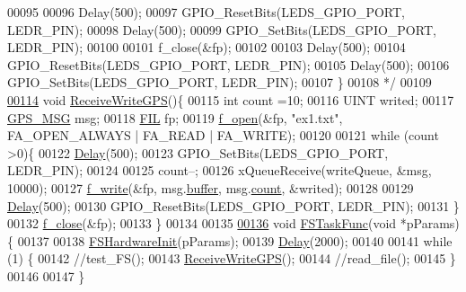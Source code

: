 \begin{DoxyCode}
00095 \textcolor{comment}{}
00096 \textcolor{comment}{  Delay(500);}
00097 \textcolor{comment}{  GPIO\_ResetBits(LEDS\_GPIO\_PORT, LEDR\_PIN);}
00098 \textcolor{comment}{  Delay(500);}
00099 \textcolor{comment}{  GPIO\_SetBits(LEDS\_GPIO\_PORT, LEDR\_PIN);}
00100 \textcolor{comment}{}
00101 \textcolor{comment}{  f\_close(&fp);}
00102 \textcolor{comment}{}
00103 \textcolor{comment}{  Delay(500);}
00104 \textcolor{comment}{  GPIO\_ResetBits(LEDS\_GPIO\_PORT, LEDR\_PIN);}
00105 \textcolor{comment}{  Delay(500);}
00106 \textcolor{comment}{  GPIO\_SetBits(LEDS\_GPIO\_PORT, LEDR\_PIN);}
00107 \textcolor{comment}{\}}
00108 \textcolor{comment}{*/}
00109 
\hypertarget{fs__task_8c_source_l00114}{}\hyperlink{fs__task_8c_a21257086cb63d29c4622a8a876a98413}{00114} \textcolor{keywordtype}{void} \hyperlink{fs__task_8c_a21257086cb63d29c4622a8a876a98413}{ReceiveWriteGPS}()\{
00115   \textcolor{keywordtype}{int} count =10;
00116   UINT writed;
00117   \hyperlink{structGPS__MSG}{GPS\_MSG} msg;
00118   \hyperlink{structFIL}{FIL} fp;
00119   \hyperlink{fileSystem_8c_aefdef7126128d99d0b3bd82c28e54d80}{f\_open}(&fp, \textcolor{stringliteral}{"ex1.txt"}, FA\_OPEN\_ALWAYS | FA\_READ | FA\_WRITE);
00120 
00121   \textcolor{keywordflow}{while} (count >0)\{
00122     \hyperlink{main_8c_a7d5d5262a3c7d9c39a226ed465e347dc}{Delay}(500);
00123     GPIO\_SetBits(LEDS\_GPIO\_PORT, LEDR\_PIN);
00124 
00125     count--;
00126     xQueueReceive(writeQueue, &msg, 10000);
00127     \hyperlink{fileSystem_8c_ae6a4dfae8a9e308bdb2283a37ef680f2}{f\_write}(&fp, msg.\hyperlink{structGPS__MSG_ac486c996a8a7a5edd1752baaea5b4571}{buffer}, msg.\hyperlink{structGPS__MSG_a4f0c127ec8708885192496df14c31a71}{count}, &writed);
00128 
00129     \hyperlink{main_8c_a7d5d5262a3c7d9c39a226ed465e347dc}{Delay}(500);
00130     GPIO\_ResetBits(LEDS\_GPIO\_PORT, LEDR\_PIN);
00131   \}
00132   \hyperlink{fileSystem_8c_a53882db20ef4323dcfd1874d7733ffc3}{f\_close}(&fp);
00133 \}
00134 
00135 
\hypertarget{fs__task_8c_source_l00136}{}\hyperlink{fs__task_8c_a941f5a214539980b9c21487c9e598ed1}{00136} \textcolor{keywordtype}{void} \hyperlink{fs__task_8c_a941f5a214539980b9c21487c9e598ed1}{FSTaskFunc}(\textcolor{keywordtype}{void} *pParams) \{
00137 
00138   \hyperlink{fs__task_8c_ab7f1e7392ed5dbe6c58be74746987f99}{FSHardwareInit}(pParams);
00139   \hyperlink{main_8c_a7d5d5262a3c7d9c39a226ed465e347dc}{Delay}(2000);
00140 
00141   \textcolor{keywordflow}{while} (1) \{
00142     \textcolor{comment}{//test\_FS();}
00143     \hyperlink{fs__task_8c_a21257086cb63d29c4622a8a876a98413}{ReceiveWriteGPS}();
00144     \textcolor{comment}{//read\_file();}
00145   \}
00146 
00147 \}
\end{DoxyCode}
